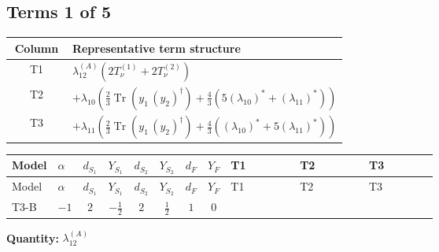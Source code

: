 \documentclass[8pt]{article}
\begin{document}
\begin{landscape}
\subsection*{Terms 1 of 5}
\begin{center}
\begin{tabular}{@{}c >{\raggedright\arraybackslash}p{0.82\linewidth}@{}}
\toprule
Column & Representative term structure \\
\midrule
T1 & \(\displaystyle {\lambda_{12}^{(A)}} (2 T_{\nu}^{(1)}+2 T_{\nu}^{(2)})\) \\
\midrule
T2 & \(\displaystyle +{\lambda_{10}} \left(\frac{2}{3} \operatorname{Tr}\!\left({y_1}\,\left({y_2}\right)^{\dagger}\right)+\frac{4}{3} (5 \left({\lambda_{10}}\right)^{*}+\left({\lambda_{11}}\right)^{*})\right)\) \\
\midrule
T3 & \(\displaystyle +{\lambda_{11}} \left(\frac{2}{3} \operatorname{Tr}\!\left({y_1}\,\left({y_2}\right)^{\dagger}\right)+\frac{4}{3} (\left({\lambda_{10}}\right)^{*}+5 \left({\lambda_{11}}\right)^{*})\right)\) \\
\midrule
\bottomrule
\end{tabular}
\end{center}
\smallskip
\tiny
\begin{longtable}{@{}llcccccc >{\raggedright\arraybackslash}p{0.21\linewidth} >{\raggedright\arraybackslash}p{0.21\linewidth} >{\raggedright\arraybackslash}p{0.21\linewidth}@{}}
\toprule
Model & $\alpha$ & $d_{S_1}$ & $Y_{S_1}$ & $d_{S_2}$ & $Y_{S_2}$ & $d_F$ & $Y_F$ & T1 & T2 & T3 \\
\midrule
\endfirsthead
\toprule
Model & $\alpha$ & $d_{S_1}$ & $Y_{S_1}$ & $d_{S_2}$ & $Y_{S_2}$ & $d_F$ & $Y_F$ & T1 & T2 & T3 \\
\midrule
\endhead
T3-B & $-1$ & $2$ & $-\frac{1}{2}$ & $2$ & $\frac{1}{2}$ & $1$ & $0$ & \scriptsize\adjustbox{max width=\linewidth}{$\begin{gathered} {\lambda_{12}^{(A)}} (2 T_{\nu}^{(1)}+2 T_{\nu}^{(2)})\end{gathered}$} & \scriptsize\adjustbox{max width=\linewidth}{$\begin{gathered} +{\lambda_{10}} \left(\frac{2}{3} \operatorname{Tr}\!\left({y_1}\,\left({y_2}\right)^{\dagger}\right)+\frac{4}{3} (5 \left({\lambda_{10}}\right)^{*}+\left({\lambda_{11}}\right)^{*})\right)\end{gathered}$} & \scriptsize\adjustbox{max width=\linewidth}{$\begin{gathered} +{\lambda_{11}} \left(\frac{2}{3} \operatorname{Tr}\!\left({y_1}\,\left({y_2}\right)^{\dagger}\right)+\frac{4}{3} (\left({\lambda_{10}}\right)^{*}+5 \left({\lambda_{11}}\right)^{*})\right)\end{gathered}$} \\
\midrule
\bottomrule
\end{longtable}
\clearpage
\noindent\textbf{Quantity: }$\lambda_{12}^{(A)}$\par\smallskip

\end{landscape}
\end{document}
